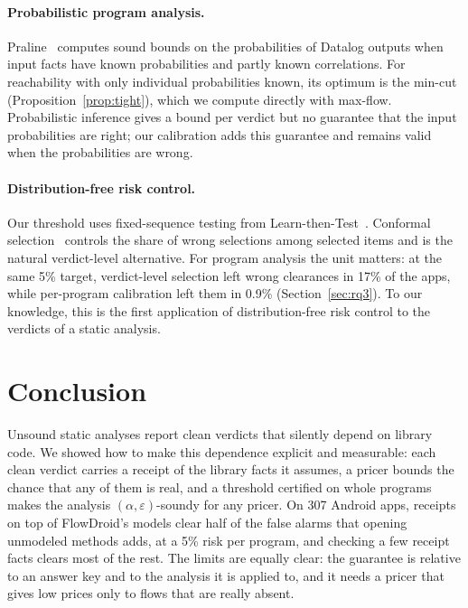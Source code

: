 \paragraph{Probabilistic program analysis.}
Praline~\cite{praline} computes sound bounds on the probabilities of Datalog outputs when input facts have known probabilities and partly known correlations.
For reachability with only individual probabilities known, its optimum is the min-cut (Proposition~\ref{prop:tight}), which we compute directly with max-flow.
Probabilistic inference gives a bound per verdict but no guarantee that the input probabilities are right; our calibration adds this guarantee and remains valid when the probabilities are wrong.

\paragraph{Distribution-free risk control.}
Our threshold uses fixed-sequence testing from Learn-then-Test~\cite{lt}.
Conformal selection~\cite{conformalselection} controls the share of wrong selections among selected items and is the natural verdict-level alternative.
For program analysis the unit matters: at the same 5\% target, verdict-level selection left wrong clearances in 17\% of the apps, while per-program calibration left them in 0.9\% (Section~\ref{sec:rq3}).
To our knowledge, this is the first application of distribution-free risk control to the verdicts of a static analysis.

\section{Conclusion}
\label{sec:conclusion}
Unsound static analyses report clean verdicts that silently depend on library code.
We showed how to make this dependence explicit and measurable: each clean verdict carries a receipt of the library facts it assumes, a pricer bounds the chance that any of them is real, and a threshold certified on whole programs makes the analysis $(\alpha,\varepsilon)$-soundy for any pricer.
On 307 Android apps, receipts on top of FlowDroid's models clear half of the false alarms that opening unmodeled methods adds, at a 5\% risk per program, and checking a few receipt facts clears most of the rest.
The limits are equally clear: the guarantee is relative to an answer key and to the analysis it is applied to, and it needs a pricer that gives low prices only to flows that are really absent.

